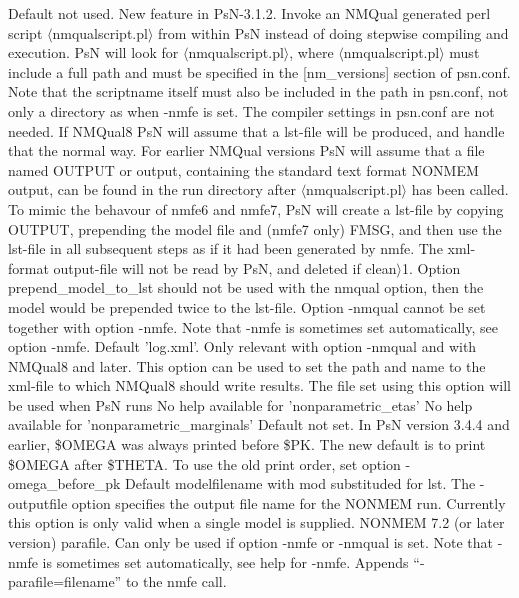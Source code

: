 \begin{optionlist}
Default not used. New feature in PsN-3.1.2. Invoke an NMQual generated perl script $\langle$nmqualscript.pl$\rangle$ from within PsN instead of doing stepwise compiling and execution. PsN will look for $\langle$nmqualscript.pl$\rangle$, where $\langle$nmqualscript.pl$\rangle$ must include a full path and must be specified in the [nm\_versions] section of psn.conf. Note that the scriptname itself must also be included in the path in psn.conf, not only a directory as when -nmfe is set. The compiler settings in psn.conf are not needed. If NMQual8 PsN will assume that a lst-file will be produced, and handle that the normal way. For earlier NMQual versions PsN will assume that a file named OUTPUT or output, containing the standard text format  NONMEM output, can be found in the run directory after $\langle$nmqualscript.pl$\rangle$ has been called. To mimic the behavour of nmfe6 and nmfe7, PsN will create a lst-file by copying OUTPUT, prepending the model file and (nmfe7 only) FMSG, and then use the lst-file in all subsequent steps as if it had been generated by nmfe. The xml-format output-file will not be read by PsN, and deleted if clean$\rangle$1. Option prepend\_model\_to\_lst should not be used with the nmqual option, then the model would be prepended twice to the lst-file. Option -nmqual cannot be set together with option -nmfe.  Note that -nmfe is sometimes set automatically, see option -nmfe. 
\nextopt
{}
Default 'log.xml'. Only relevant with option -nmqual and with NMQual8 and later. This option can be used to set the path and name to the xml-file to which NMQual8 should write results. The file set using  this option will be used when PsN runs  
\nextopt
{}
No help available for 'nonparametric\_etas' 
\nextopt
{}
No help available for 'nonparametric\_marginals' 
\nextopt
{}
Default not set. In PsN version 3.4.4 and earlier, \$OMEGA was always printed before \$PK. The new default is to print \$OMEGA after \$THETA. To use the old print order, set option -omega\_before\_pk 
\nextopt
{}
Default modelfilename with mod substituded for lst. The -outputfile option specifies the output file name for the NONMEM run. Currently this option is only valid when a single model is supplied. 
\nextopt
{}
NONMEM 7.2 (or later version) parafile. Can only be used if option -nmfe or -nmqual is set. Note that -nmfe is sometimes set automatically, see help for -nmfe. Appends “-parafile=filename” to the nmfe call. 

\end{optionlist}
